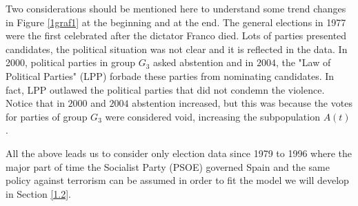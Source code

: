 Two considerations should be mentioned here to understand some trend changes in
Figure \ref{1graf1} at the beginning and at the end. The general elections in
1977 were the first celebrated after the dictator Franco died. Lots of
parties presented candidates, the political situation was not clear and it
is reflected in the data. In 2000, political parties in group $G_{3}$ asked abstention and in $2004$, the "Law of Political Parties" (LPP) forbade these parties from nominating candidates. In fact, LPP outlawed the political parties that did not condemn the violence. Notice that in $2000$ and $2004$ abstention increased, but this was because the votes for parties of group $G_{3}$ were considered void, increasing the subpopulation $A\left( t\right)$.

All the above leads us to consider only election data since 1979 to 1996
where the major part of time the Socialist Party (PSOE) governed Spain and
the same policy against terrorism can be assumed in order to fit the
model we will develop in Section \ref{1.2}.

